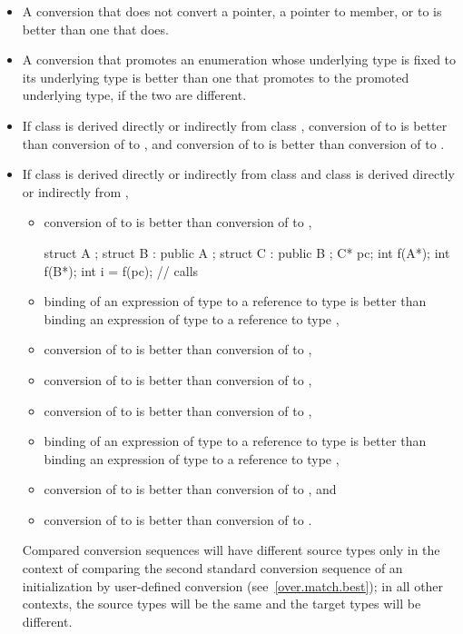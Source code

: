 \begin{itemize}
\item
A conversion that does not convert a pointer,
a pointer to member, or 
to
is better than one that does.

\item
A conversion that promotes an enumeration whose underlying type is fixed to its underlying
type is better than one that promotes to the promoted underlying type, if the two are
different.

\item
If class
is derived directly or indirectly from class
,
conversion of
to
is better than conversion of
to
,
and conversion of
to
is better than conversion
of
to
.
\item
If class
is derived directly or indirectly from class
and class
is derived directly or indirectly from
,

\begin{itemize}
\item
conversion of
to
is better than conversion of
to
,
\enterexample

\begin{codeblock}
struct A {};
struct B : public A {};
struct C : public B {};
C* pc;
int f(A*);
int f(B*);
int i = f(pc);                  // calls 
\end{codeblock}
\exitexample

\item
binding of an expression of type
to a reference to type
is better than binding an expression of type
to a reference to type
,
\item
conversion of
to
is better than conversion of
to
,
\item
conversion of
to
is better than conversion of
to
,
\item
conversion of
to
is better than conversion of
to
,
\item
binding of an expression of type
to a reference to type
is better than binding an expression of type
to a
reference to type
,
\item
conversion of
to
is better than conversion
of
to
,
and
\item
conversion of
to
is better than conversion of
to
.
\end{itemize}

\enternote
Compared conversion sequences will have different source types only in the
context of comparing the second standard conversion sequence of an
initialization by user-defined conversion (see~\ref{over.match.best}); in
all other contexts, the source types will be the same and the target
types will be different.
\exitnote
\end{itemize}%
